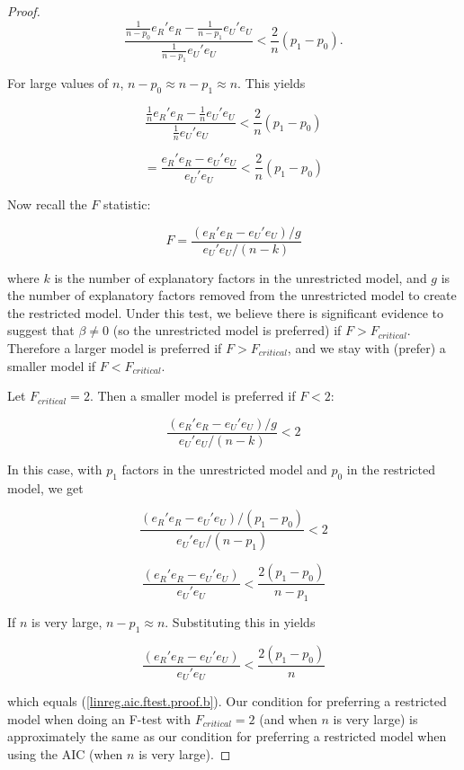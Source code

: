 \begin{proof}
\[
\frac{\frac{1}{n-p_0}{e_R}'e_R - \frac{1}{n-p_1}{e_U}' e_U}{\frac{1}{n-p_1}{e_U}' e_U} < \frac{2}{n}(p_1 - p_0).
\]

For large values of \(n\), \(n - p_0 \approx n - p_1 \approx n\). This yields

\[
\frac{\frac{1}{n}{e_R}'e_R - \frac{1}{n}{e_U}' e_U}{\frac{1}{n}{e_U}' e_U} < \frac{2}{n}(p_1 - p_0)
\]

\begin{equation}\label{linreg.aic.ftest.proof.b}
= \frac{{e_R}'e_R - {e_U}'e_U}{{e_U}'e_U} < \frac{2}{n}(p_1 - p_0)
\end{equation}

Now recall the \(F\) statistic:

\begin{equation}\label{linreg.aic.ftest.proof.d}
F = \frac{({e_R}'e_R - {e_U}'e_U)/g}{{e_U}'e_U/(n - k)}
\end{equation}

where \(k\) is the number of explanatory factors in the unrestricted model, and \(g\) is the number of explanatory factors removed from the unrestricted model to create the restricted model. Under this test, we believe there is significant evidence to suggest that \(\beta \neq 0\) (so the unrestricted model is preferred) if \(F > F_{critical}\). Therefore a larger model is preferred if \(F > F_{critical}\), and we stay with (prefer) a smaller model if \(F < F_{critical}\).

Let \(F_{critical} = 2\). Then a smaller model is preferred if \(F < 2\):

\[
\frac{({e_R}'e_R - {e_U}'e_U)/g}{{e_U}'e_U/(n - k)} < 2
\]

In this case, with \(p_1\) factors in the unrestricted model and \(p_0\) in the restricted model, we get

\[
\frac{({e_R}'e_R - {e_U}'e_U)/(p_1 - p_0)}{{e_U}'e_U/(n - p_1)} < 2
\]

\[
\frac{({e_R}'e_R - {e_U}'e_U)}{{e_U}'e_U} < \frac{2(p_1 - p_0)}{n - p_1}
\]

If \(n\) is very large, \(n - p_1 \approx n\). Substituting this in yields


\begin{equation}\label{linreg.aic.ftest.proof.e}
\frac{({e_R}'e_R - {e_U}'e_U)}{{e_U}'e_U} < \frac{2(p_1 - p_0)}{n}
\end{equation}

which equals (\ref{linreg.aic.ftest.proof.b}). Our condition for preferring a restricted model when doing an F-test with \(F_{critical} = 2\) (and when \(n\) is very large) is approximately the same as our condition for preferring a restricted model when using the AIC (when \(n\) is very large).

\end{proof}

